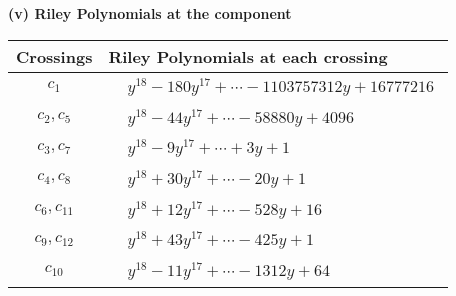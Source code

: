 \documentclass[1p]{elsarticle_modified}
\theoremstyle{definition}
\begin{document}
\flushleft \textbf{(v) Riley Polynomials at the component}\newline \\
\begin{tabular}{m{50pt}|m{274pt}}
Crossings & \hspace{64pt}Riley Polynomials at each crossing \\
\hline $$\begin{aligned}c_{1}\end{aligned}$$&$\begin{aligned}
&y^{18}-180 y^{17}+\cdots-1103757312 y+16777216
\end{aligned}$\\
\hline $$\begin{aligned}c_{2},c_{5}\end{aligned}$$&$\begin{aligned}
&y^{18}-44 y^{17}+\cdots-58880 y+4096
\end{aligned}$\\
\hline $$\begin{aligned}c_{3},c_{7}\end{aligned}$$&$\begin{aligned}
&y^{18}-9 y^{17}+\cdots+3 y+1
\end{aligned}$\\
\hline $$\begin{aligned}c_{4},c_{8}\end{aligned}$$&$\begin{aligned}
&y^{18}+30 y^{17}+\cdots-20 y+1
\end{aligned}$\\
\hline $$\begin{aligned}c_{6},c_{11}\end{aligned}$$&$\begin{aligned}
&y^{18}+12 y^{17}+\cdots-528 y+16
\end{aligned}$\\
\hline $$\begin{aligned}c_{9},c_{12}\end{aligned}$$&$\begin{aligned}
&y^{18}+43 y^{17}+\cdots-425 y+1
\end{aligned}$\\
\hline $$\begin{aligned}c_{10}\end{aligned}$$&$\begin{aligned}
&y^{18}-11 y^{17}+\cdots-1312 y+64
\end{aligned}$\\
\hline
\end{tabular}\\~\\
\end{document}
